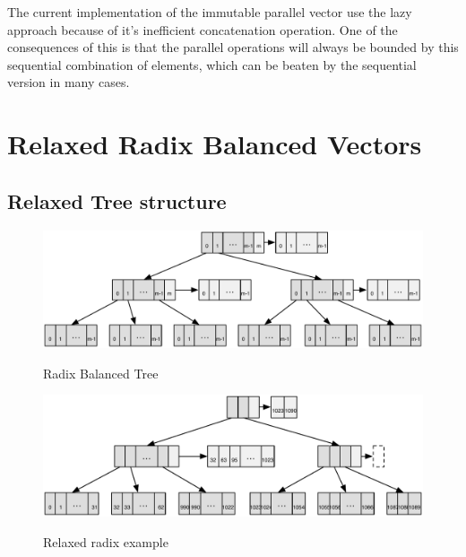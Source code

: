 The current implementation of the immutable parallel vector \cite{scalaParVector211} use the lazy approach because of it's inefficient concatenation operation. One of the consequences of this is that the parallel operations will always be bounded by this sequential combination of elements, which can be beaten by the sequential version in many cases.
 


\section{Relaxed Radix Balanced Vectors}


\subsection{Relaxed Tree structure}

\begin{figure}[h!]
  \centering
  \includegraphics[width=\textwidth]{Figures/Relaxed_Radix_balanced}
  \label{Relaxed_Radix_balanced}
  \caption{Radix Balanced Tree}
\end{figure}

\begin{figure}[h!]
  \centering
  \includegraphics[width=\textwidth]{Figures/Relaxed_radix_example}
  \label{Relaxed_radix_example}
  \caption{Relaxed radix example}
\end{figure}

